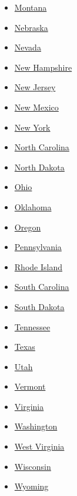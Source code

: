 \begin{itemize}
\tightlist
\item
  \href{//www.nytimes.com/elections/2016/results/montana}{Montana}
\item
  \href{//www.nytimes.com/elections/2016/results/nebraska}{Nebraska}
\item
  \href{//www.nytimes.com/elections/2016/results/nevada}{Nevada}
\item
  \href{//www.nytimes.com/elections/2016/results/new-hampshire}{New
  Hampshire}
\item
  \href{//www.nytimes.com/elections/2016/results/new-jersey}{New Jersey}
\item
  \href{//www.nytimes.com/elections/2016/results/new-mexico}{New Mexico}
\item
  \href{//www.nytimes.com/elections/2016/results/new-york}{New York}
\item
  \href{//www.nytimes.com/elections/2016/results/north-carolina}{North
  Carolina}
\item
  \href{//www.nytimes.com/elections/2016/results/north-dakota}{North
  Dakota}
\item
  \href{//www.nytimes.com/elections/2016/results/ohio}{Ohio}
\item
  \href{//www.nytimes.com/elections/2016/results/oklahoma}{Oklahoma}
\item
  \href{//www.nytimes.com/elections/2016/results/oregon}{Oregon}
\item
  \href{//www.nytimes.com/elections/2016/results/pennsylvania}{Pennsylvania}
\end{itemize}

\begin{itemize}
\tightlist
\item
  \href{//www.nytimes.com/elections/2016/results/rhode-island}{Rhode
  Island}
\item
  \href{//www.nytimes.com/elections/2016/results/south-carolina}{South
  Carolina}
\item
  \href{//www.nytimes.com/elections/2016/results/south-dakota}{South
  Dakota}
\item
  \href{//www.nytimes.com/elections/2016/results/tennessee}{Tennessee}
\item
  \href{//www.nytimes.com/elections/2016/results/texas}{Texas}
\item
  \href{//www.nytimes.com/elections/2016/results/utah}{Utah}
\item
  \href{//www.nytimes.com/elections/2016/results/vermont}{Vermont}
\item
  \href{//www.nytimes.com/elections/2016/results/virginia}{Virginia}
\item
  \href{//www.nytimes.com/elections/2016/results/washington}{Washington}
\item
  \href{//www.nytimes.com/elections/2016/results/west-virginia}{West
  Virginia}
\item
  \href{//www.nytimes.com/elections/2016/results/wisconsin}{Wisconsin}
\item
  \href{//www.nytimes.com/elections/2016/results/wyoming}{Wyoming}
\end{itemize}

